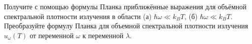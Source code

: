 \documentclass[__main__.tex]{subfiles}
\begin{document}
Получите с помощью формулы Планка приближённые выражения для объёмной спектральной плотности излучения в области (а) $\hbar\omega\ll k_{B}T$, (б) $\hbar\omega\ll k_{B}T$. Преобразуйте формулу Планка для объемной спектральной плотности излучения $u_{\omega}(T)$ от переменной $\omega$ к переменной $\lambda$.\\ 

\end{document}

